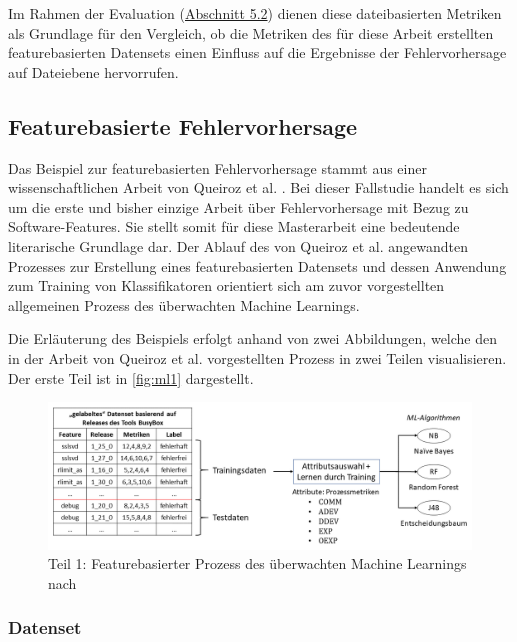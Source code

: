Im Rahmen der Evaluation (\hyperref[classic-eval]{Abschnitt 5.2}) dienen diese dateibasierten Metriken als Grundlage für den Vergleich, ob die Metriken des für diese Arbeit erstellten featurebasierten Datensets einen Einfluss auf die Ergebnisse der Fehlervorhersage auf Dateiebene hervorrufen. 

\subsection*{Featurebasierte Fehlervorhersage}

Das Beispiel zur featurebasierten Fehlervorhersage stammt aus einer wissenschaftlichen Arbeit von Queiroz et al. \cite{Queiroz2016}. Bei dieser Fallstudie handelt es sich um die erste und bisher einzige Arbeit über Fehlervorhersage mit Bezug zu Software-Features. Sie stellt somit für diese Masterarbeit eine bedeutende literarische Grundlage dar. Der Ablauf des von Queiroz et al. angewandten Prozesses zur Erstellung eines featurebasierten Datensets und dessen Anwendung zum Training von Klassifikatoren orientiert sich am zuvor vorgestellten allgemeinen Prozess des überwachten Machine Learnings.

Die Erläuterung des Beispiels erfolgt anhand von zwei Abbildungen, welche den in der Arbeit von Queiroz et al. vorgestellten Prozess in zwei Teilen visualisieren. Der erste Teil ist in \autoref{fig:ml1} dargestellt.

\begin{figure}[ht]
    \centering
    \captionsetup{justification=centering}
    \includegraphics[width=\textwidth]{images/ML1}
    \caption{Teil 1: Featurebasierter Prozess des überwachten Machine Learnings nach \cite{Queiroz2016}}\label{fig:ml1}
\end{figure}

\subsubsection*{Datenset}

